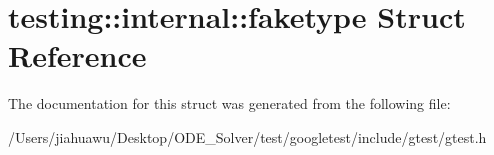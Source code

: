 \hypertarget{structtesting_1_1internal_1_1faketype}{}\section{testing\+:\+:internal\+:\+:faketype Struct Reference}
\label{structtesting_1_1internal_1_1faketype}


The documentation for this struct was generated from the following file\+:\begin{DoxyCompactItemize}
\item 
/\+Users/jiahuawu/\+Desktop/\+O\+D\+E\+\_\+\+Solver/test/googletest/include/gtest/gtest.\+h\end{DoxyCompactItemize}
